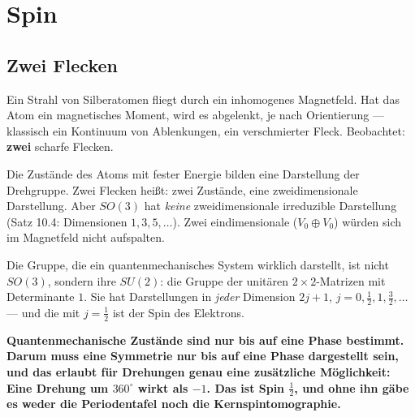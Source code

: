 \chapter{Spin}

\section{Zwei Flecken}

\begin{merksatz}
Ein Strahl von Silberatomen fliegt durch ein inhomogenes Magnetfeld. Hat das Atom ein magnetisches Moment, wird es abgelenkt, je nach Orientierung --- klassisch ein Kontinuum von Ablenkungen, ein verschmierter Fleck. Beobachtet: \textbf{zwei} scharfe Flecken.

Die Zustände des Atoms mit fester Energie bilden eine Darstellung der Drehgruppe. Zwei Flecken heißt: zwei Zustände, eine zweidimensionale Darstellung. Aber $SO(3)$ hat \emph{keine} zweidimensionale irreduzible Darstellung (Satz 10.4: Dimensionen $1, 3, 5, \dots$). Zwei eindimensionale ($V_0\oplus V_0$) würden sich im Magnetfeld nicht aufspalten.

Die Gruppe, die ein quantenmechanisches System wirklich darstellt, ist nicht $SO(3)$, sondern ihre  $SU(2)$: die Gruppe der unitären $2\times2$-Matrizen mit Determinante $1$. Sie hat Darstellungen in \emph{jeder} Dimension $2j + 1$, $j = 0, \frac12, 1, \frac32, \dots$ --- und die mit $j = \frac12$ ist der Spin des Elektrons.

\begin{center}
\begin{minipage}{0.9\textwidth}
\textbf{Quantenmechanische Zustände sind nur bis auf eine Phase bestimmt. Darum muss eine Symmetrie nur bis auf eine Phase dargestellt sein, und das erlaubt für Drehungen genau eine zusätzliche Möglichkeit: Eine Drehung um $360^{\circ}$ wirkt als $-1$. Das ist Spin $\tfrac12$, und ohne ihn gäbe es weder die Periodentafel noch die Kernspintomographie.}
\end{minipage}
\end{center}

\begin{center}
\begin{minipage}{0.88\textwidth}
\end{minipage}
\end{center}
\end{merksatz}

